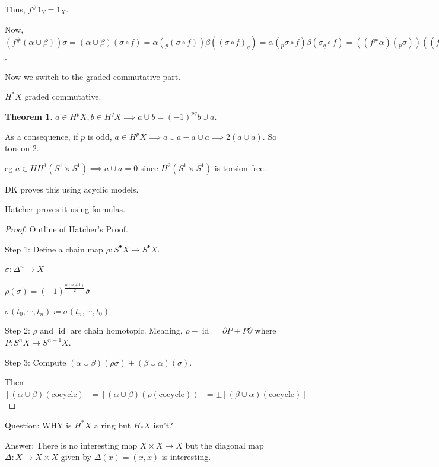 \documentclass{article}
\theoremstyle{definition}
\newtheorem{theorem}{Theorem}
\begin{document}
    Thus, \(f^\# 1_Y = 1_X\).

    Now, \((f^\# (\alpha \cup \beta))\sigma  = (\alpha \cup \beta)(\sigma \circ f) = \alpha(_p (\sigma \circ f))\beta ((\sigma \circ f)_q) = \alpha (_p \sigma \circ f) \beta(\sigma_q \circ f) = ((f^\# \alpha)(_p \sigma))((f^\# \beta)(\sigma_q)) = (f^\# \alpha \cup f^\# \beta)(\sigma)\).

    Now we switch to the graded commutative part.

    \(H^{\ast} X\) graded commutative.

    \begin{theorem}
        \(a \in H^p X, b\in H^q X \implies a\cup b = (-1)^{pq} b \cup a\).
    \end{theorem}

    As a consequence, if \(p\) is odd, \(a\in H^p X \implies a\cup a - a\cup a \implies 2(a\cup a)\). So torsion \(2\).

    eg \(a\in H H^1(S^1 \times S^1) \implies a\cup a = 0\) since \(H^2(S^1 \times S^1)\) is torsion free.  

    DK proves this using acyclic models.

    Hatcher proves it using formulas.

    \begin{proof}
        Outline of Hatcher's Proof.

        Step 1: Define a chain map \(\rho: S^\bullet X \to S^\bullet X\).

        \(\sigma: \Delta^n \to X\) 

        \(\rho(\sigma) = (-1)^{\frac{n(n+1)}{2}}\overline{\sigma}\) 

        \(\overline{\sigma}(t_0, \cdots , t_n) \coloneqq \sigma(t_n, \cdots , t_0)\)

        Step 2: \(\rho\) and \(\operatorname{id}\) are chain homotopic. Meaning, \(\rho - \operatorname{id} = \partial P + P \partial\) where \(P: S^n X \to S^{n+1} X\).

        Step 3: Compute \((\alpha \cup \beta)(\rho \sigma) \pm (\beta \cup \alpha)(\sigma)\).
        
        Then \([(\alpha \cup \beta)(\text{cocycle})] = [(\alpha \cup \beta)(\rho(\text{cocycle}))] = \pm[(\beta \cup \alpha)(\text{cocycle})]\) 
        
    \end{proof}

    Question: WHY is \(H^{\ast} X\) a ring but \(H_{\ast} X\) isn't?

    Answer: There is no interesting map \(X \times X \to X\) but the diagonal map \(\Delta : X \to X \times X\) given by \(\Delta(x) = (x,x)\) is interesting.
\end{document}
